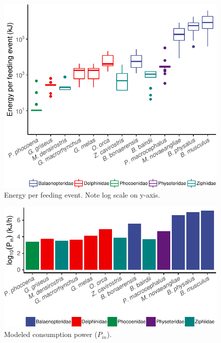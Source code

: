 \documentclass[]{elsarticle} %
\makeatletter
\def\maxwidth{\ifdim\Gin@nat@width>\linewidth\linewidth
\else\Gin@nat@width\fi}
\let\Oldincludegraphics\includegraphics
\renewcommand{\includegraphics}[1]{\Oldincludegraphics[width=\maxwidth]{#1}}
\makeatother
\begin{document}
\begin{figure}
\centering
\includegraphics{Sonar_Response_Manuscript_files/figure-latex/Ep_fig-1.pdf}
\caption{Energy per feeding event. Note log scale on y-axis.
\label{Ep_fig}}
\end{figure}

\begin{figure}
\centering
\includegraphics{Sonar_Response_Manuscript_files/figure-latex/Pin_fig-1.pdf}
\caption{Modeled consumption power (\(P_{in}\)). \label{Pin_fig}}
\end{figure}
\end{document}
